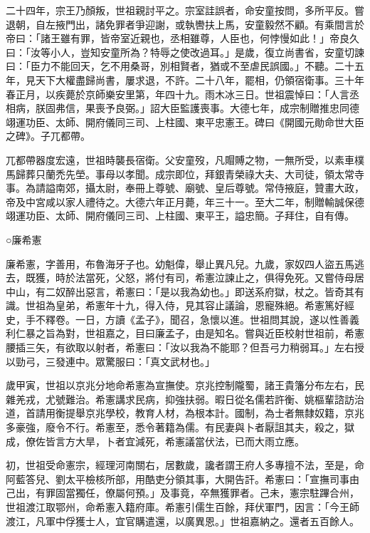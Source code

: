 \begin{pinyinscope}
 二十四年，宗王乃顏叛，世祖親討平之。宗室詿誤者，命安童按問，多所平反。嘗退朝，自左掖門出，諸免罪者爭迎謝，或執轡扶上馬，安童毅然不顧。有乘間言於帝曰：「諸王雖有罪，皆帝室近親也，丞相雖尊，人臣也，何悖慢如此！」帝良久曰：「汝等小人，豈知安童所為？特辱之使改過耳。」是歲，復立尚書省，安童切諫曰：「臣力不能回天，乞不用桑哥，別相賢者，猶或不至虐民誤國。」不聽。二十五年，見天下大權盡歸尚書，屢求退，不許。二十八年，罷相，仍領宿衛事。三十年春正月，以疾薨於京師樂安里第，年四十九。雨木冰三日。世祖震悼曰：「人言丞相病，朕固弗信，果喪予良弼。」詔大臣監護喪事。大德七年，成宗制贈推忠同德翊運功臣、太師、開府儀同三司、上柱國、東平忠憲王。碑曰《開國元勛命世大臣之碑》。子兀都帶。



 兀都帶器度宏遠，世祖時襲長宿衛。父安童歿，凡賵賻之物，一無所受，以素車樸馬歸葬只蘭禿先塋。事母以孝聞。成宗即位，拜銀青榮祿大夫、大司徒，領太常寺事。為請謚南郊，攝太尉，奉冊上尊號、廟號、皇后尊號。常侍掖庭，贊畫大政，帝及中宮咸以家人禮待之。大德六年正月薨，年三十一。至大二年，制贈輸誠保德翊運功臣、太師、開府儀同三司、上柱國、東平王，謚忠簡。子拜住，自有傳。



 ○廉希憲



 廉希憲，字善用，布魯海牙子也。幼魁偉，舉止異凡兒。九歲，家奴四人盜五馬逃去，既獲，時於法當死，父怒，將付有司，希憲泣諫止之，俱得免死。又嘗侍母居中山，有二奴醉出惡言，希憲曰：「是以我為幼也。」即送系府獄，杖之。皆奇其有識。世祖為皇弟，希憲年十九，得入侍，見其容止議論，恩寵殊絕。希憲篤好經史，手不釋卷。一日，方讀《孟子》，聞召，急懷以進。世祖問其說，遂以性善義利仁暴之旨為對，世祖嘉之，目曰廉孟子，由是知名。嘗與近臣校射世祖前，希憲腰插三矢，有欲取以射者，希憲曰：「汝以我為不能耶？但吾弓力稍弱耳。」左右授以勁弓，三發連中。眾驚服曰：「真文武材也。」



 歲甲寅，世祖以京兆分地命希憲為宣撫使。京兆控制隴蜀，諸王貴籓分布左右，民雜羌戎，尤號難治。希憲講求民病，抑強扶弱。暇日從名儒若許衡、姚樞輩諮訪治道，首請用衡提舉京兆學校，教育人材，為根本計。國制，為士者無隸奴籍，京兆多豪強，廢令不行。希憲至，悉令著籍為儒。有民妻與卜者厭詛其夫，殺之，獄成，僚佐皆言方大旱，卜者宜減死，希憲議當伏法，已而大雨立應。



 初，世祖受命憲宗，經理河南關右，居數歲，讒者謂王府人多專擅不法，至是，命阿藍答兒、劉太平檢核所部，用酷吏分領其事，大開告訐。希憲曰：「宣撫司事由己出，有罪固當獨任，僚屬何預。」及事竟，卒無獲罪者。己未，憲宗駐蹕合州，世祖渡江取鄂州，命希憲入籍府庫。希憲引儒生百餘，拜伏軍門，因言：「今王師渡江，凡軍中俘獲士人，宜官購遣還，以廣異恩。」世祖嘉納之。還者五百餘人。




\end{pinyinscope}
